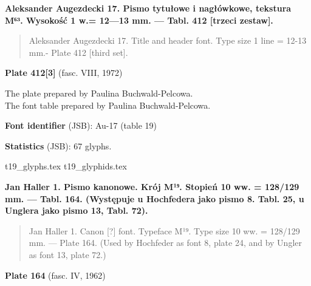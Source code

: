 \documentclass[12pt]{article}
\newcommand{\bg}{\begingl}
\newcommand{\pismoPL}[1]{{\relsize{2}\Junicode\textbf{#1}}}
\newcommand{\pismoEN}[1]{{\relsize{1}\Junicode\begin{quote}#1\end{quote}}}
\newcommand{\plate}[3]{\textbf{Plate #1} (fasc. #2, #3)}
\newcommand{\fontID}[2]{{\relsize{1}\Junicode\textbf{Font identifier} (JSB): #1 (table #2)}}
\newcommand{\fontstat}[1]{{\relsize{1}\Junicode\textbf{Statistics} (JSB): #1 glyphs.}}
\begin{document}
 
 \newpage



\pismoPL{Aleksander Augezdecki 17. Pismo tytułowe i nagłówkowe, tekstura M⁶³. Wysokość 1 w.= 12—13 mm. — Tabl. 412 [trzeci zestaw].}

\pismoEN{Aleksander Augezdecki 17. Title
  and header font. Type size 1 line = 12-13 mm.- Plate 412 [third set].}

\plate{412[3]}{VIII}{1972}

The plate    prepared by Paulina Buchwald-Pelcowa.\\
The font table    prepared by Paulina Buchwald-Pelcowa.\\

\bigskip

\fontID{Au-17}{19}

\fontstat{67}

  {t19_glyphs.tex}
  {t19_glyphids.tex}


     \newpage



  \pismoPL{Jan Haller 1. Pismo kanonowe. Krój M¹⁹. Stopień 10 ww. =
    128/129 mm. — Tabl. 164. (Występuje u Hochfedera jako pismo
    8. Tabl. 25, u Unglera jako pismo 13,  Tabl. 72). }


  
  \pismoEN{Jan Haller 1. Canon [?] font. Typeface M¹⁹. Type size 10
    ww. = 128/129 mm. — Plate 164. (Used by Hochfeder as font 8, plate
    24, and by Ungler as font 13, plate 72.)}

\plate{164}{IV}{1962}
\end{document}
